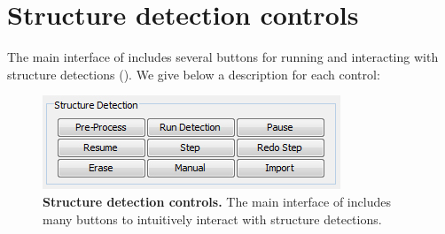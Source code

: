 
\section{Structure detection controls}\label{sec:structure_controls}
The main interface of \wingj includes several buttons for running and interacting with structure detections (). We give below a description for each control:\\

\begin{figure}[!h]
\centering
\includegraphics[scale=0.8]{images/structure_detection_buttons.jpg}
\caption{\textbf{Structure detection controls.} The main interface of \wingj includes many buttons to intuitively interact with structure detections.}
\label{fig:structure_detection_buttons}
\end{figure}

